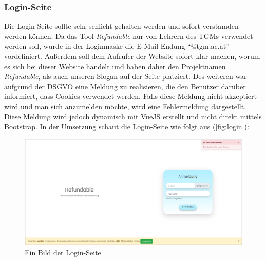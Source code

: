 \subsubsection{Login-Seite}
\label{chapter:implementierung-frontend-komponenten-login}
Die Login-Seite sollte sehr schlicht gehalten werden und sofort verstamden werden können. Da das Tool \textit{Refundable} nur von Lehrern des TGMs verwendet werden soll, wurde in der Loginmaske die E-Mail-Endung \enquote{@tgm.ac.at} vordefiniert. Außerdem soll dem Aufrufer der Website sofort klar machen, worum es sich bei dieser Website handelt und haben daher den Projektnamen \textit{Refundable}, als auch unseren Slogan auf der Seite platziert. Des weiteren war aufgrund der DSGVO eine Meldung zu realisieren, die den Benutzer darüber informiert, dass Cookies verwendet werden. Falls diese Meldung nicht akzeptiert wird und man sich anzumelden möchte, wird eine Fehlermeldung dargestellt. Diese Meldung wird jedoch dynamisch mit VueJS erstellt und nicht direkt mittels Bootstrap. In der Umsetzung schaut die Login-Seite wie folgt aus (\autoref{fig:login}):
\begin{figure}[H]
	\centering
	\includegraphics[width=1\linewidth]{images/website/login}
	\caption[Login]{Ein Bild der Login-Seite}
	\label{fig:login}
\end{figure}

